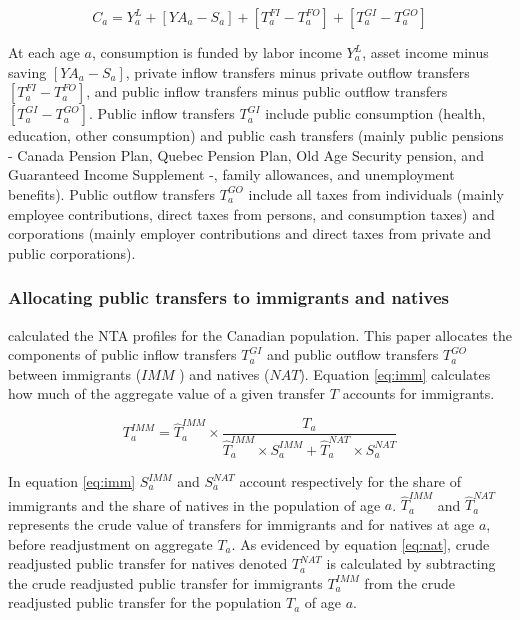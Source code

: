 \begin{equation}\label{eq:ntamain}
  C_a = Y^L_a+[YA_a-S_a]+[T^{FI}_a-T^{FO}_a]+[T^{GI}_a-T^{GO}_a]
\end{equation}

At each age \(a\), consumption is funded by labor  income \(Y^L_a\), asset income minus saving \([YA_a-S_a]\), private inflow transfers minus private outflow transfers \([T^{FI}_a-T^{FO}_a]\), and public inflow transfers minus public outflow transfers \([T^{GI}_a-T^{GO}_a]\).
Public inflow transfers \(T^{GI}_a\) include public consumption (health, education, other consumption) and public cash transfers (mainly public pensions - Canada Pension Plan, Quebec Pension Plan, Old Age Security pension, and Guaranteed Income Supplement -, family allowances, and unemployment benefits).
Public outflow transfers  \(T^{GO}_a\) include all taxes from individuals (mainly employee contributions, direct taxes from persons, and consumption taxes) and corporations (mainly employer contributions and direct taxes from private and public corporations).

\subsubsection*{Allocating public transfers to immigrants and natives}
\citet{merettePopulationAgingCanada2019} calculated the NTA profiles for the Canadian population.
This paper allocates the components of public inflow transfers \(T^{GI}_a\) and public outflow transfers \(T^{GO}_a\) between immigrants (\(IMM\) ) and natives (\(NAT\)).
Equation \eqref{eq:imm} calculates how much of the aggregate value of a given transfer \(T\) accounts for immigrants.

\begin{equation}\label{eq:imm}
 {T}^{IMM}_a = \hat{T}^{IMM}_a \times \frac{{T}_a}{\hat{T}^{IMM}_a \times S^{IMM}_a + \hat{T}^{NAT}_a \times S^{NAT}_a}
\end{equation}

In equation \eqref{eq:imm} \( S^{IMM}_a \) and \( S^{NAT}_a \) account respectively for the share of immigrants and the share of natives in the population of age \(a\). \(\hat{T}^{IMM}_a \) and \( \hat{T}^{NAT}_a\) represents the crude value of transfers for immigrants and for natives at age \(a\), before readjustment on aggregate \({T}_a \).
As evidenced by equation \eqref{eq:nat}, crude readjusted public transfer for natives denoted \({T}^{NAT}_a \) is calculated by subtracting the crude readjusted public transfer for immigrants \({T}^{IMM}_a \) from the crude readjusted public transfer for the population \({T}_a \) of age \(a\).

